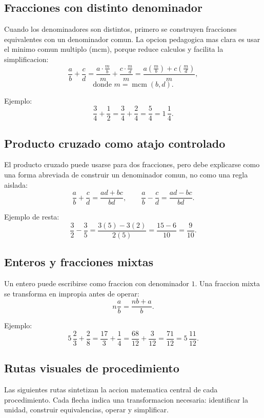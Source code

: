 \documentclass[
	spanish,
	letterpaper, oneside
]{article}
\begin{document}
\subsection{Fracciones con distinto denominador}

Cuando los denominadores son distintos, primero se construyen fracciones equivalentes con un denominador comun. La opcion pedagogica mas clara es usar el minimo comun multiplo (mcm), porque reduce calculos y facilita la simplificacion:
\[
	\frac{a}{b}+\frac{c}{d}
	=\frac{a\cdot \frac{m}{b}}{m}+\frac{c\cdot \frac{m}{d}}{m}
	=\frac{a\left(\frac{m}{b}\right)+c\left(\frac{m}{d}\right)}{m},
\]
\[
	\text{donde } m=\operatorname{mcm}(b,d).
\]

Ejemplo:
\[
	\frac{3}{4}+\frac{1}{2}=\frac{3}{4}+\frac{2}{4}=\frac{5}{4}=1\,\frac{1}{4}.
\]

\subsection{Producto cruzado como atajo controlado}

El producto cruzado puede usarse para dos fracciones, pero debe explicarse como una forma abreviada de construir un denominador comun, no como una regla aislada:
\[
	\frac{a}{b}+\frac{c}{d}=\frac{ad+bc}{bd},
	\qquad
	\frac{a}{b}-\frac{c}{d}=\frac{ad-bc}{bd}.
\]

Ejemplo de resta:
\[
	\frac{3}{2}-\frac{3}{5}=\frac{3(5)-3(2)}{2(5)}=\frac{15-6}{10}=\frac{9}{10}.
\]

\subsection{Enteros y fracciones mixtas}

Un entero puede escribirse como fraccion con denominador $1$. Una fraccion mixta se transforma en impropia antes de operar:
\[
	n\frac{a}{b}=\frac{nb+a}{b}.
\]

Ejemplo:
\[
	5\,\frac{2}{3}+\frac{2}{8}=\frac{17}{3}+\frac{1}{4}=\frac{68}{12}+\frac{3}{12}=\frac{71}{12}=5\,\frac{11}{12}.
\]

\subsection{Rutas visuales de procedimiento}

Las siguientes rutas sintetizan la accion matematica central de cada procedimiento. Cada flecha indica una transformacion necesaria: identificar la unidad, construir equivalencias, operar y simplificar.
\end{document}
